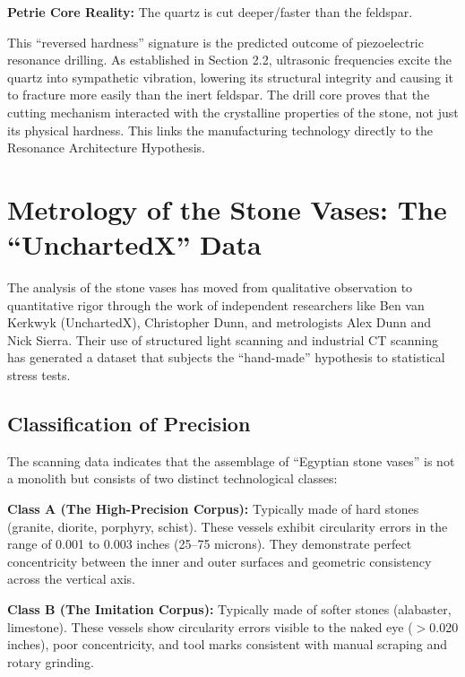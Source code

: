 \documentclass[11pt]{article}
\begin{document}
\textbf{Petrie Core Reality:} The quartz is cut deeper/faster than the feldspar.

This ``reversed hardness'' signature is the predicted outcome of piezoelectric resonance drilling. As established in Section 2.2, ultrasonic frequencies excite the quartz into sympathetic vibration, lowering its structural integrity and causing it to fracture more easily than the inert feldspar. The drill core proves that the cutting mechanism interacted with the crystalline properties of the stone, not just its physical hardness. This links the manufacturing technology directly to the Resonance Architecture Hypothesis.

\section{Metrology of the Stone Vases: The ``UnchartedX'' Data}

The analysis of the stone vases has moved from qualitative observation to quantitative rigor through the work of independent researchers like Ben van Kerkwyk (UnchartedX), Christopher Dunn, and metrologists Alex Dunn and Nick Sierra. Their use of structured light scanning and industrial CT scanning has generated a dataset that subjects the ``hand-made'' hypothesis to statistical stress tests.

\subsection{Classification of Precision}

The scanning data indicates that the assemblage of ``Egyptian stone vases'' is not a monolith but consists of two distinct technological classes:

\textbf{Class A (The High-Precision Corpus):} Typically made of hard stones (granite, diorite, porphyry, schist). These vessels exhibit circularity errors in the range of 0.001 to 0.003 inches (25--75 microns). They demonstrate perfect concentricity between the inner and outer surfaces and geometric consistency across the vertical axis.

\textbf{Class B (The Imitation Corpus):} Typically made of softer stones (alabaster, limestone). These vessels show circularity errors visible to the naked eye ($>$0.020 inches), poor concentricity, and tool marks consistent with manual scraping and rotary grinding.
\end{document}
